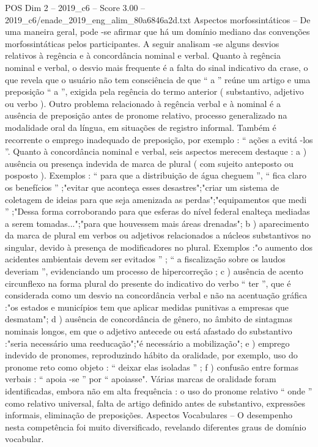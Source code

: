 \begin{textsample}{POS Dim 2 – 2019\_c6 – Score 3.00 – 2019\_c6/enade\_2019\_eng\_alim\_80a6846a2d.txt}
Aspectos morfossintáticos – De uma maneira geral, pode -se afirmar que há um domínio mediano das convenções morfossintáticas pelos participantes.
A seguir analisam -se alguns desvios relativos à regência e à concordância nominal e verbal.
Quanto à regência nominal e verbal, o desvio mais frequente é a falta do sinal indicativo da crase, o que revela que o usuário não tem consciência de que “ a ” reúne um artigo e uma preposição “ a ”, exigida pela regência do termo anterior ( substantivo, adjetivo ou verbo ).
Outro problema relacionado à regência verbal e à nominal é a ausência de preposição antes de pronome relativo, processo generalizado na modalidade oral da língua, em situações de registro informal.
Também é recorrente o emprego inadequado de preposição, por exemplo : “ ações a evitá -los ”.
Quanto à concordância nominal e verbal, seis aspectos merecem destaque : a ) ausência ou presença indevida de marca de plural ( com sujeito anteposto ou posposto ).
Exemplos : “ para que a distribuição de água cheguem ”, “ fica claro os benefícios ” ;"evitar que aconteça esses desastres";"criar um sistema de coletagem de ideias para que seja amenizada as perdas";"equipamentos que medi ” ;"Dessa forma corroborando para que esferas do nível federal enalteça mediadas a serem tomadas...";"para que houvessem mais áreas drenadas"; b ) aparecimento da marca de plural em verbos ou adjetivos relacionados a núcleos substantivos no singular, devido à presença de modificadores no plural.
Exemplos :"o aumento dos acidentes ambientais devem ser evitados ” ; “ a fiscalização sobre os laudos deveriam ”, evidenciando um processo de hipercorreção ; c ) ausência de acento circunflexo na forma plural do presente do indicativo do verbo “ ter ”, que é considerada como um desvio na concordância verbal e não na acentuação gráfica :"os estados e municípios tem que aplicar medidas punitivas a empresas que desmatam"; d ) ausência de concordância de gênero, no âmbito de sintagmas nominais longos, em que o adjetivo antecede ou está afastado do substantivo :"seria necessário uma reeducação";"é necessário a mobilização"; e ) emprego indevido de pronomes, reproduzindo hábito da oralidade, por exemplo, uso do pronome reto como objeto : “ deixar elas isoladas ” ; f ) confusão entre formas verbais : “ apoia -se ” por “ apoiasse".
Várias marcas de oralidade foram identificadas, embora não em alta frequência : o uso do pronome relativo “ onde ” como relativo universal, falta de artigo definido antes de substantivo, expressões informais, eliminação de preposições.
Aspectos Vocabulares – O desempenho nesta competência foi muito diversificado, revelando diferentes graus de domínio vocabular.

\end{textsample}
